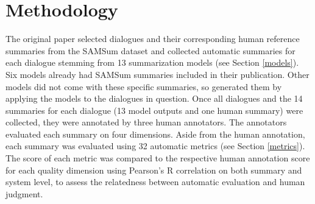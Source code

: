 


\section{Methodology}
The original paper selected dialogues and their corresponding human reference summaries from the SAMSum dataset and collected automatic summaries for each dialogue stemming from 13 summarization models (see Section \ref{models}). Six models already had SAMSum summaries included in their publication. Other models did not come with these specific summaries, so \citet{gao2022dialsummeval} generated them by applying the models to the dialogues in question. Once all dialogues and the 14 summaries for each dialogue (13 model outputs and one human summary) were collected, they were annotated by three human annotators. The annotators evaluated each summary on four dimensions. Aside from the human annotation, each summary was evaluated using 32 automatic metrics (see Section \ref{metrics}). The score of each metric was compared to the respective human annotation score for each quality dimension using Pearson's R correlation on both summary and system level, to assess the relatedness between automatic evaluation and human judgment.

